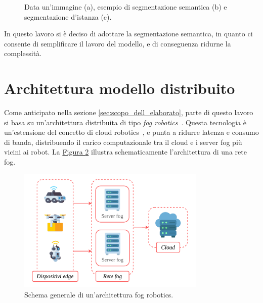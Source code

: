 \documentclass[12pt]{report}
\begin{document}
\begin{figure}[t]
	\centering
	\hspace{0.01\textwidth}
	\hspace{0.01\textwidth}
	\caption{Data un'immagine (a), esempio di segmentazione semantica (b) e segmentazione d'istanza (c).}
	\label{fig:segmentazione}
\end{figure}

In questo lavoro si è deciso di adottare la segmentazione semantica, in quanto ci consente di semplificare il lavoro del modello, e di conseguenza ridurne la complessità.

\section{Architettura modello distribuito}
\label{sec:modello_per_fog_robotics}

Come anticipato nella sezione \ref{sec:scopo_dell_elaborato}, parte di questo lavoro si basa su un'architettura distribuita di tipo \textit{fog robotics}~\cite{10.1145/2757384.2757397}. Questa tecnologia è un'estensione del concetto di cloud robotics~\cite{qian2009cloud}, e punta a ridurre latenza e consumo di banda, distribuendo il carico computazionale tra il cloud e i server fog più vicini ai robot. La \hyperref[fig:fog_robotics]{Figura \ref{fig:fog_robotics}} illustra schematicamente l'architettura di una rete fog.

\begin{figure}[t]
	\centering
	\includegraphics[width=0.8\textwidth, clip]{images/fog-robotics}
	\caption{Schema generale di un'architettura fog robotics.}
	\label{fig:fog_robotics}
\end{figure} 
\end{document}
